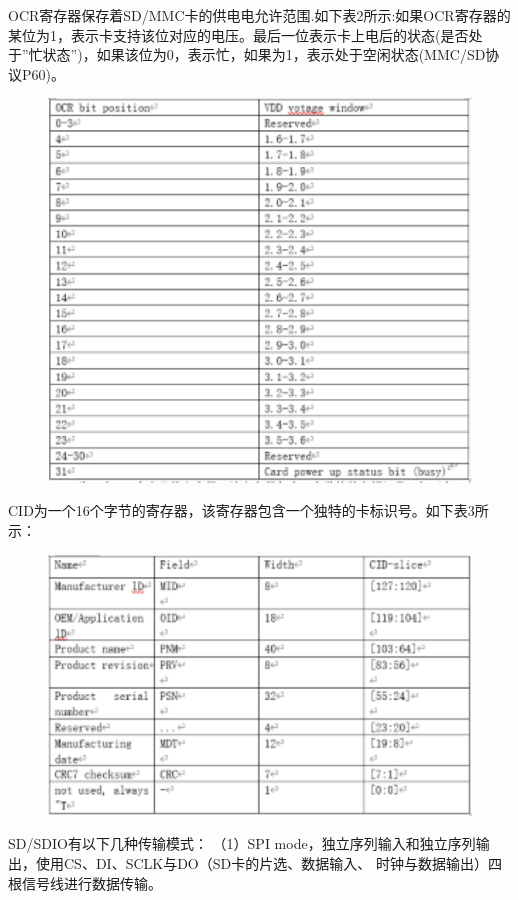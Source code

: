 OCR寄存器保存着SD/MMC卡的供电电允许范围.如下表2所示:如果OCR寄存器的某位为1，表示卡支持该位对应的电压。最后一位表示卡上电后的状态(是否处于”忙状态”)，如果该位为0，表示忙，如果为1，表示处于空闲状态(MMC/SD协议P60)。
\begin{figure}[H]
    \centering
    \includegraphics{figures/06-02-供电点允.png}
\end{figure}

CID为一个16个字节的寄存器，该寄存器包含一个独特的卡标识号。如下表3所示：
\begin{figure}[H]
    \centering
    \includegraphics{figures/06-02-卡标标识.png}
\end{figure}

SD/SDIO有以下⼏种传输模式：
（1）SPI mode，独⽴序列输⼊和独⽴序列输出，使⽤CS、DI、SCLK与DO（SD卡的⽚选、数据输⼊、
时钟与数据输出）四根信号线进⾏数据传输。

